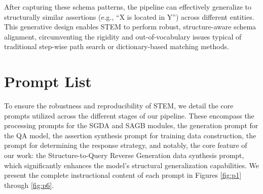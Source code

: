 \documentclass[11pt]{article}
\begin{document}
After capturing these schema patterns, the pipeline can effectively generalize to structurally similar assertions (e.g., ``X is located in Y'') across different entities. This generative design enables STEM to perform robust, structure-aware schema alignment, circumventing the rigidity and out-of-vocabulary issues typical of traditional step-wise path search or dictionary-based matching methods.


\section{Prompt List}
\label{sec:promptlist}

To ensure the robustness and reproducibility of STEM, we detail the core prompts utilized across the different stages of our pipeline. These encompass the processing prompts for the SGDA and SAGB modules, the generation prompt for the QA model, the assertion synthesis prompt for training data construction, the prompt for determining the response strategy, and notably, the core feature of our work: the Structure-to-Query Reverse Generation data synthesis prompt, which significantly enhances the model's structural generalization capabilities. We present the complete instructional content of each prompt in Figures \ref{fig:p1} through \ref{fig:p6}.

\end{document}
